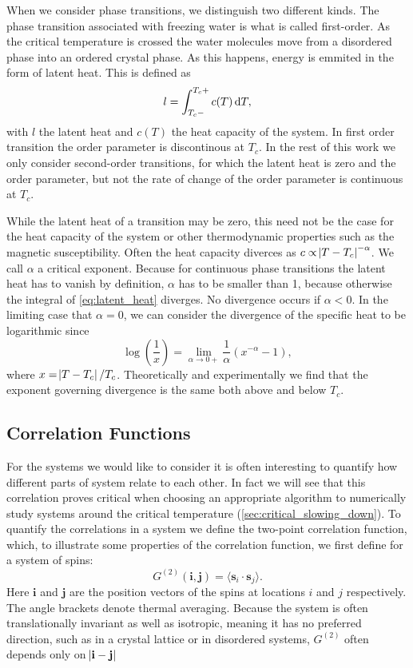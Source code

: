 \documentclass[11pt, a4paper]{report} %
\begin{document}
When we consider phase transitions, we distinguish two different kinds.
The phase transition associated with freezing water is what is called first-order.
As the critical temperature is crossed the water molecules move from a disordered phase into an ordered crystal phase.
As this happens, energy is emmited in the form of latent heat.
This is defined as
\begin{equation}
	\label{eq:latent_heat}
	l = \int_{T_c-}^{T_c+} c(T) \dif T,
\end{equation}
with \(l\) the latent heat and \(c(T)\) the heat capacity of the system.
In first order transition the order parameter is discontinous at \(T_c\).\cite{binney:1992}
In the rest of this work we only consider second-order transitions, for which the latent heat is zero and the order parameter, but not the rate of change of the order parameter is continuous at \(T_c\).

While the latent heat of a transition may be zero, this need not be the case for the heat capacity of the system or other thermodynamic properties such as the magnetic susceptibility.
Often the heat capacity diverces as \(c \propto \abs{T-T_c}^{-\alpha}\).
We call \(\alpha\) a critical exponent.
Because for continuous phase transitions the latent heat has to vanish by definition, \(\alpha\) has to be smaller than 1, because otherwise the integral of \cref{eq:latent_heat} diverges.
No divergence occurs if \(\alpha < 0\).
In the limiting case that \(\alpha = 0\), we can consider the divergence of the specific heat to be logarithmic since
\begin{equation}
	\log(\frac{1}{x}) = \lim_{\alpha \to 0+} \frac{1}{\alpha}\left(x^{-\alpha} - 1\right),
\end{equation}
where \(x = \abs{T - T_c}/T_c\).
Theoretically and experimentally we find that the exponent governing divergence is the same both above and below \(T_c\).\cite{binney:1992}

\subsection{Correlation Functions}
For the systems we would like to consider it is often interesting to quantify how different parts of system relate to each other.
In fact we will see that this correlation proves critical when choosing an appropriate algorithm to numerically study systems around the critical temperature (\cref{sec:critical_slowing_down}).
To quantify the correlations in a system we define the two-point correlation function\cite{binney:1992}, which, to illustrate some properties of the correlation function, we first define for a system of spins:
\begin{equation}
	G^{(2)}(\mathbf{i}, \mathbf{j}) = \langle{\mathbf{s}_i \cdot \mathbf{s}_j}\rangle.
\end{equation}
Here \(\mathbf{i}\) and \(\mathbf{j}\) are the position vectors of the spins at locations \(i\) and \(j\) respectively.
The angle brackets denote thermal averaging.
Because the system is often translationally invariant as well as isotropic, meaning it has no preferred direction, such as in a crystal lattice or in disordered systems, \(G^{(2)}\) often depends only on \(\abs{\mathbf{i} - \mathbf{j}} \)
\end{document}
